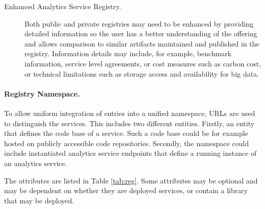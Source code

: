 \begin{description}
\item[Enhanced Analytics Service Registry.] Both public and private
  registries may need to be enhanced by providing detailed information
  so the user has a better understanding of the offering and allows
  comparison to similar artifacts maintained and published in the
  registry. Information details may include, for example, benchmark
  information, service level agreements, or cost measures such as
  carbon cost, or technical limitations such as storage access and
  availability for big data.
  
\end{description}

\paragraph*{Registry Namespace.}
To allow uniform integration of entries into a unified namespace, URLs
are used to distinguish the services. This includes two different
entities. Firstly, an entity that defines the code base of a
service. Such a code base could be for example hosted on publicly
accessible code repositories. Secondly, the namespace could include
instantiated analytics service endpoints that define a running
instance of an analytics service.

The attributes are listed in Table \ref{tab:reg}. Some attributes may
be optional and may be dependent on whether they are deployed services, or
contain a library that may be deployed.


